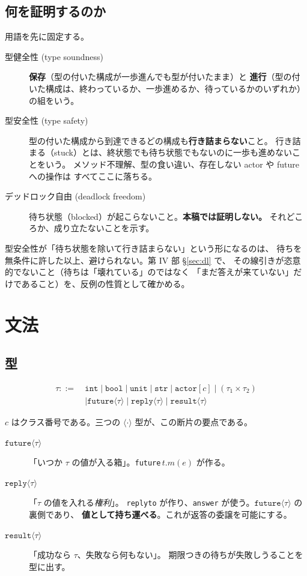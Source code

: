 \documentclass[11pt,a4paper]{ltjsarticle}
\theoremstyle{definition}
\theoremstyle{remark}
\newcommand{\tint}{\ensuremath{\mathtt{int}}}
\newcommand{\tbool}{\ensuremath{\mathtt{bool}}}
\newcommand{\tunit}{\ensuremath{\mathtt{unit}}}
\newcommand{\tstr}{\ensuremath{\mathtt{str}}}
\newcommand{\tact}[1]{\ensuremath{\mathtt{actor}[#1]}}
\newcommand{\tfut}[1]{\ensuremath{\mathtt{future}\langle #1 \rangle}}
\newcommand{\trep}[1]{\ensuremath{\mathtt{reply}\langle #1 \rangle}}
\newcommand{\tres}[1]{\ensuremath{\mathtt{result}\langle #1 \rangle}}
\newcommand{\tpair}[2]{\ensuremath{(#1 \times #2)}}
\newcommand{\stuck}{\textsf{stuck}}
\newcommand{\blocked}{\textsf{blocked}}
\begin{document}
\subsection{何を証明するのか}

用語を先に固定する。
\begin{description}
\item[型健全性 (type soundness)]
  \textbf{保存}（型の付いた構成が一歩進んでも型が付いたまま）と
  \textbf{進行}（型の付いた構成は、終わっているか、一歩進めるか、待っているかのいずれか）
  の組をいう。
\item[型安全性 (type safety)]
  型の付いた構成から到達できるどの構成も\textbf{行き詰まらない}こと。
  行き詰まる（\stuck）とは、終状態でも待ち状態でもないのに一歩も進めないことをいう。
  メソッド不理解、型の食い違い、存在しない actor や future への操作は
  すべてここに落ちる。
\item[デッドロック自由 (deadlock freedom)]
  待ち状態（\blocked）が起こらないこと。\textbf{本稿では証明しない。}
  それどころか、成り立たないことを示す。
\end{description}

型安全性が「待ち状態を除いて行き詰まらない」という形になるのは、
待ちを無条件に許した以上、避けられない。第 IV 部 \S\ref{sec:dl} で、
その線引きが恣意的でないこと（待ちは「壊れている」のではなく
「まだ答えが来ていない」だけであること）を、反例の性質として確かめる。

\section{文法}

\subsection{型}

\begin{align*}
\tau ::=\ & \tint \mid \tbool \mid \tunit \mid \tstr
   \mid \tact{c} \mid \tpair{\tau_1}{\tau_2} \\
   & \mid \tfut{\tau} \mid \trep{\tau} \mid \tres{\tau}
\end{align*}

$c$ はクラス番号である。三つの $\langle\cdot\rangle$ 型が、この断片の要点である。

\begin{description}
\item[\tfut{\tau}] 「いつか $\tau$ の値が入る箱」。\texttt{future}\,$t.m(e)$ が作る。
\item[\trep{\tau}] 「$\tau$ の値を入れる\emph{権利}」。
  \texttt{replyto} が作り、\texttt{answer} が使う。\tfut{\tau} の裏側であり、
  \textbf{値として持ち運べる}。これが返答の委譲を可能にする。
\item[\tres{\tau}] 「成功なら $\tau$、失敗なら何もない」。
  期限つきの待ちが失敗しうることを型に出す。
\end{description}
\end{document}
